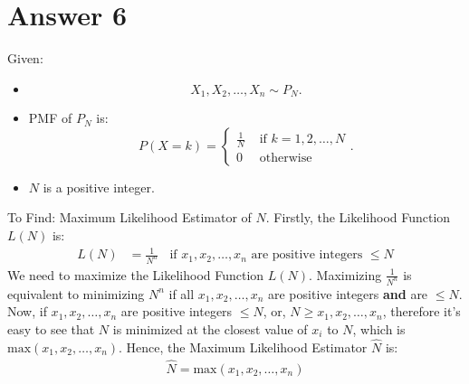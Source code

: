 \documentclass[a4paper]{article}
\begin{document}
\section{Answer 6}
Given:
\begin{itemize}
	\item {\[
				X_1,X_2,\dots,X_n \sim P_N
	.\] }
\item{PMF of $P_N$ is:
	\[
	P\left( X = k \right) = \begin{cases}
		\frac{1}{N} & \text{ if } k =1,2,\dots,N\\
		0 & \text{ otherwise}
	\end{cases}
	.\] 
	}
\item{$N$ is a positive integer.}
\end{itemize}
To Find: Maximum Likelihood Estimator of $N$.
 \newline\newline
 Firstly, the Likelihood Function $L\left( N \right) $ is:
 \begin{equation*}
 	\begin{split}
		L\left( N \right) &= \frac{1}{N^{n}}  \;\;\text{ if $x_1,x_2,\dots,x_n$ are positive integers $\le N$}
	\end{split}
 \end{equation*}
 We need to maximize the Likelihood Function $L\left( N \right) $.
 \newline\newline
 Maximizing $\frac{1}{N^{n}}$ is equivalent to minimizing $N^{n}$ if all $x_1,x_2, \dots, x_n$ are positive integers \textbf{and} are $\le  N$.
 \newline\newline
 Now, if $x_1,x_2,\dots,x_n$ are positive integers $\le  N$, or, $N \ge x_1,x_2,\dots,x_{n}$, therefore it's easy to see that $N$ is minimized at the closest value of  $x_i$ to $N$, which is  $\text{max}\left( x_1,x_2,\dots,x_{n} \right)$. 
 \newline\newline
 Hence, the Maximum Likelihood Estimator $\hat{N}$ is:
  \begin{equation*}
 	\begin{split}
		\hat{N} = \text{max}\left( x_1,x_2,\dots,x_{n} \right) 
 	\end{split}
 \end{equation*}
\end{document}
